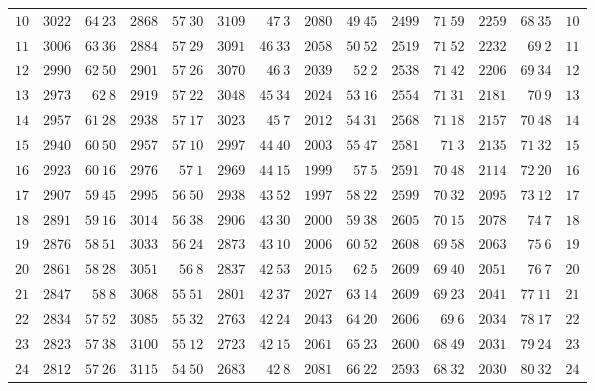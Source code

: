 \begin{center}
\begin{tabular}{r|r|r|r|r|r|r|r|r|r|r|r|r|r}
$10$ & $3022$ & $64\ 23$ & $2868$ & $57\ 30$ & $3109$ & $47\ 3$ & $2080$ & $49\ 45$ & $2499$ & $71\ 59$ & $2259$ & $68\ 35$ & $10$ \\[3pt]
$11$ & $3006$ & $63\ 36$ & $2884$ & $57\ 29$ & $3091$ & $46\ 33$ & $2058$ & $50\ 52$ & $2519$ & $71\ 52$ & $2232$ & $69\ 2$ & $11$ \\
$12$ & $2990$ & $62\ 50$ & $2901$ & $57\ 26$ & $3070$ & $46\ 3$ & $2039$ & $52\ 2$ & $2538$ & $71\ 42$ & $2206$ & $69\ 34$ & $12$ \\
$13$ & $2973$ & $62\ 8$ & $2919$ & $57\ 22$ & $3048$ & $45\ 34$ & $2024$ & $53\ 16$ & $2554$ & $71\ 31$ & $2181$ & $70\ 9$ & $13$ \\
$14$ & $2957$ & $61\ 28$ & $2938$ & $57\ 17$ & $3023$ & $45\ 7$ & $2012$ & $54\ 31$ & $2568$ & $71\ 18$ & $2157$ & $70\ 48$ & $14$ \\
$15$ & $2940$ & $60\ 50$ & $2957$ & $57\ 10$ & $2997$ & $44\ 40$ & $2003$ & $55\ 47$ & $2581$ & $71\ 3$ & $2135$ & $71\ 32$ & $15$ \\[3pt]
$16$ & $2923$ & $60\ 16$ & $2976$ & $57\ 1$ & $2969$ & $44\ 15$ & $1999$ & $57\ 5$ & $2591$ & $70\ 48$ & $2114$ & $72\ 20$ & $16$ \\
$17$ & $2907$ & $59\ 45$ & $2995$ & $56\ 50$ & $2938$ & $43\ 52$ & $1997$ & $58\ 22$ & $2599$ & $70\ 32$ & $2095$ & $73\ 12$ & $17$ \\
$18$ & $2891$ & $59\ 16$ & $3014$ & $56\ 38$ & $2906$ & $43\ 30$ & $2000$ & $59\ 38$ & $2605$ & $70\ 15$ & $2078$ & $74\ 7$ & $18$ \\
$19$ & $2876$ & $58\ 51$ & $3033$ & $56\ 24$ & $2873$ & $43\ 10$ & $2006$ & $60\ 52$ & $2608$ & $69\ 58$ & $2063$ & $75\ 6$ & $19$ \\
$20$ & $2861$ & $58\ 28$ & $3051$ & $56\ 8$ & $2837$ & $42\ 53$ & $2015$ & $62\ 5$ & $2609$ & $69\ 40$ & $2051$ & $76\ 7$ & $20$ \\[3pt]
$21$ & $2847$ & $58\ 8$ & $3068$ & $55\ 51$ & $2801$ & $42\ 37$ & $2027$ & $63\ 14$ & $2609$ & $69\ 23$ & $2041$ & $77\ 11$ & $21$ \\
$22$ & $2834$ & $57\ 52$ & $3085$ & $55\ 32$ & $2763$ & $42\ 24$ & $2043$ & $64\ 20$ & $2606$ & $69\ 6$ & $2034$ & $78\ 17$ & $22$ \\
$23$ & $2823$ & $57\ 38$ & $3100$ & $55\ 12$ & $2723$ & $42\ 15$ & $2061$ & $65\ 23$ & $2600$ & $68\ 49$ & $2031$ & $79\ 24$ & $23$ \\
$24$ & $2812$ & $57\ 26$ & $3115$ & $54\ 50$ & $2683$ & $42\ 8$ & $2081$ & $66\ 22$ & $2593$ & $68\ 32$ & $2030$ & $80\ 32$ & $24$ \\

\end{tabular}
\end{center}
